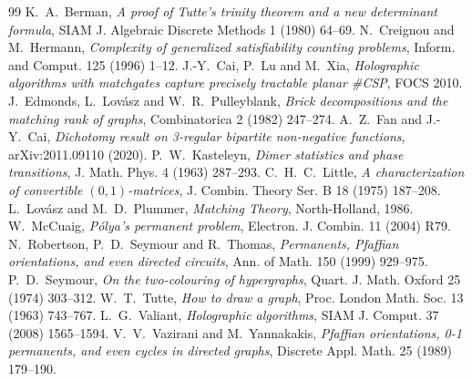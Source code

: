 \documentclass[11pt]{article}
\theoremstyle{definition}
\theoremstyle{remark}
\begin{document}
\begin{thebibliography}{99}
 K.~A.~Berman, \emph{A proof of Tutte's trinity theorem and a
new determinant formula}, SIAM J. Algebraic Discrete Methods 1 (1980) 64--69.
 N.~Creignou and M.~Hermann, \emph{Complexity of generalized
satisfiability counting problems}, Inform. and Comput. 125 (1996) 1--12.
 J.-Y.~Cai, P.~Lu and M.~Xia, \emph{Holographic algorithms with
matchgates capture precisely tractable planar \#CSP}, FOCS 2010.
 J.~Edmonds, L.~Lov\'asz and W.~R.~Pulleyblank, \emph{Brick
decompositions and the matching rank of graphs}, Combinatorica 2 (1982)
247--274.
 A.~Z.~Fan and J.-Y.~Cai, \emph{Dichotomy result on 3-regular
bipartite non-negative functions}, arXiv:2011.09110 (2020).
 P.~W.~Kasteleyn, \emph{Dimer statistics and phase
transitions}, J. Math. Phys. 4 (1963) 287--293.
 C.~H.~C.~Little, \emph{A characterization of convertible
$(0,1)$-matrices}, J. Combin. Theory Ser. B 18 (1975) 187--208.
 L.~Lov\'asz and M.~D.~Plummer, \emph{Matching Theory},
North-Holland, 1986.
 W.~McCuaig, \emph{P\'olya's permanent problem}, Electron. J.
Combin. 11 (2004) R79.
 N.~Robertson, P.~D.~Seymour and R.~Thomas, \emph{Permanents,
Pfaffian orientations, and even directed circuits}, Ann. of Math. 150 (1999)
929--975.
 P.~D.~Seymour, \emph{On the two-colouring of hypergraphs},
Quart. J. Math. Oxford 25 (1974) 303--312.
 W.~T.~Tutte, \emph{How to draw a graph}, Proc. London Math.
Soc. 13 (1963) 743--767.
 L.~G.~Valiant, \emph{Holographic algorithms}, SIAM J. Comput.
37 (2008) 1565--1594.
 V.~V.~Vazirani and M.~Yannakakis, \emph{Pfaffian orientations,
0-1 permanents, and even cycles in directed graphs}, Discrete Appl. Math. 25
(1989) 179--190.
\end{thebibliography}
\end{document}
